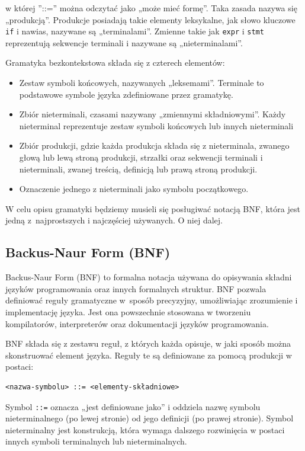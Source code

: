 w której ''::='' można odczytać jako „może mieć formę”. Taka zasada nazywa się „produkcją”. Produkcje posiadają takie elementy leksykalne, jak słowo kluczowe \texttt{if} i nawias, nazywane są „terminalami”. Zmienne takie jak \texttt{expr} i \texttt{stmt} reprezentują sekwencje terminali i nazywane są „nieterminalami”.

Gramatyka bezkontekstowa składa się z czterech elementów:
\begin{itemize}
    \item Zestaw symboli końcowych, nazywanych „leksemami”. Terminale to podstawowe symbole języka zdefiniowane przez gramatykę.
    \item Zbiór nieterminali, czasami nazywany „zmiennymi składniowymi”. Każdy nieterminal reprezentuje zestaw symboli końcowych lub innych nieterminali
    \item Zbiór produkcji, gdzie każda produkcja składa się z nieterminala, zwanego głową lub lewą stroną produkcji, strzałki oraz sekwencji terminali i nieterminali, zwanej treścią, definicją lub prawą stroną produkcji.
    \item Oznaczenie jednego z nieterminali jako symbolu początkowego.
\end{itemize}

W celu opisu gramatyki będziemy musieli się posługiwać notacją BNF, która jest jedną z~najprostszych i najczęściej używanych. O niej dalej.

\subsection{Backus-Naur Form (BNF)}

Backus-Naur Form (BNF) to formalna notacja używana do opisywania składni języków programowania oraz innych formalnych struktur. BNF pozwala definiować reguły gramatyczne w~sposób precyzyjny, umożliwiając zrozumienie i implementację języka. Jest ona powszechnie stosowana w tworzeniu kompilatorów, interpreterów oraz dokumentacji języków programowania.

BNF składa się z zestawu reguł, z których każda opisuje, w jaki sposób można skonstruować element języka. Reguły te są definiowane za pomocą produkcji w postaci:

\begin{verbatim}
<nazwa-symbolu> ::= <elementy-składniowe>
\end{verbatim}

Symbol \texttt{::=} oznacza „jest definiowane jako” i oddziela nazwę symbolu nieterminalnego (po lewej stronie) od jego definicji (po prawej stronie). Symbol nieterminalny jest konstrukcją, która wymaga dalszego rozwinięcia w postaci innych symboli terminalnych lub nieterminalnych.

